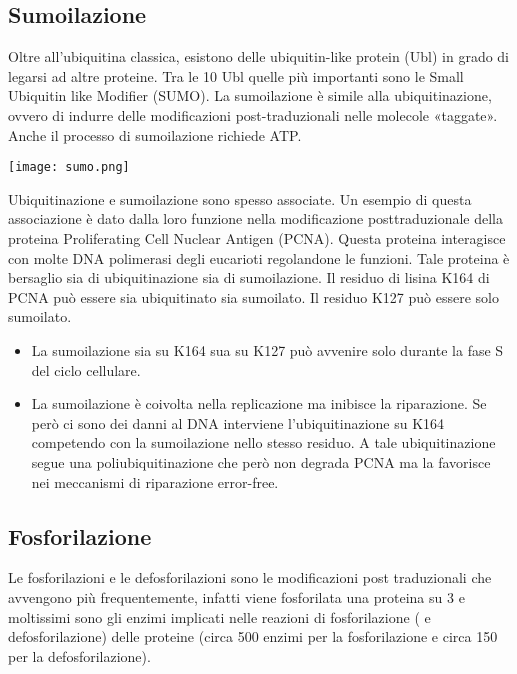 \documentclass{article}
\begin{document}
\subsection{Sumoilazione}
Oltre all'ubiquitina classica, esistono delle ubiquitin-like protein (Ubl) in grado di legarsi ad altre proteine. Tra le 10 Ubl
quelle più importanti sono le Small Ubiquitin like Modifier (SUMO). La sumoilazione è simile alla ubiquitinazione, ovvero di indurre delle modificazioni post-traduzionali nelle
molecole «taggate». Anche il processo di sumoilazione richiede ATP.
\begin{center}
    \texttt{[image: sumo.png]}
\end{center}
Ubiquitinazione e sumoilazione sono spesso associate. Un esempio di questa associazione è dato dalla loro funzione nella modificazione posttraduzionale della proteina Proliferating Cell Nuclear Antigen (PCNA).
Questa proteina interagisce con molte DNA polimerasi degli eucarioti regolandone le funzioni. Tale proteina è bersaglio sia di ubiquitinazione sia di sumoilazione. Il residuo di lisina K164 di
PCNA può essere sia ubiquitinato sia sumoilato. Il residuo K127 può essere solo sumoilato.
\begin{itemize}
    \item La sumoilazione sia su K164 sua su K127 può avvenire solo durante la fase S del ciclo cellulare.
    \item La sumoilazione è coivolta nella replicazione ma inibisce la riparazione. Se però ci sono dei
    danni al DNA interviene l'ubiquitinazione su K164 competendo con la sumoilazione nello
    stesso residuo. A tale ubiquitinazione segue una poliubiquitinazione che però non degrada
    PCNA ma la favorisce nei meccanismi di riparazione error-free.
\end{itemize}
\subsection{Fosforilazione}
Le fosforilazioni e le defosforilazioni sono le modificazioni post traduzionali che avvengono più frequentemente, infatti
viene fosforilata una proteina su 3 e moltissimi sono gli enzimi implicati nelle reazioni di fosforilazione ( e
defosforilazione) delle proteine (circa 500 enzimi per la fosforilazione e circa 150 per la defosforilazione).
\end{document}
